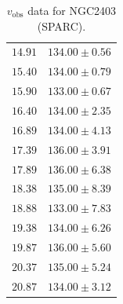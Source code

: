\documentclass{article}
\newcommand\vobs{\ensuremath{v_{\textrm{obs}}}}
\begin{document}
\begin{table}[h!]
\begin{tabular}{|c|c|}
        $14.91$ & $134.00 \pm 0.56$ \\
        $15.40$ & $134.00 \pm 0.79$ \\
        $15.90$ & $133.00 \pm 0.67$ \\
        $16.40$ & $134.00 \pm 2.35$ \\
        $16.89$ & $134.00 \pm 4.13$ \\
        $17.39$ & $136.00 \pm 3.91$ \\
        $17.89$ & $136.00 \pm 6.38$ \\
        $18.38$ & $135.00 \pm 8.39$ \\
        $18.88$ & $133.00 \pm 7.83$ \\
        $19.38$ & $134.00 \pm 6.26$ \\
        $19.87$ & $136.00 \pm 5.60$ \\
        $20.37$ & $135.00 \pm 5.24$ \\
        $20.87$ & $134.00 \pm 3.12$ \\
        \hline
    \end{tabular}
    \caption{$\vobs$ data for NGC2403 (SPARC).}
    \label{tab:raw2403}
\end{table}

\doublespacing

\nocite{*}
\printbibliography
\end{document}
